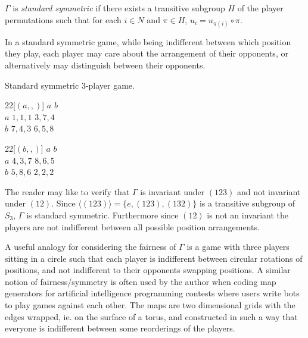 \begin{definition}
	$\Gamma$ is \textit{standard symmetric} \cite{NoahXE} if there exists a transitive subgroup $H$ of the player permutations such that for each $i \in N$ and $\pi \in H$, $u_i = u_{\pi(i)} \circ \pi$. 
\end{definition}

	In a standard symmetric game, while being indifferent between which position they play, each player may care about the arrangement of their opponents, or alternatively may distinguish between their opponents.

	\begin{example} \label{stdsymeg} Standard symmetric 3-player game.
		\begin{center}
  		\begin{game}{2}{2}[$(a,,)$]
				\>  $a$      \>  $b$      \\
			$a$	\>  $1,1,1$  \>  $3,7,4$  \\
			$b$	\>  $7,4,3$  \>  $6,5,8$  
		\end{game}
		\hspace*{5mm}
		\begin{game}{2}{2}[$(b,,)$]
				\>  $a$      \>  $b$      \\
			$a$	\>  $4,3,7$  \>  $8,6,5$  \\
   			$b$	\>  $5,8,6$  \>  $2,2,2$  
		\end{game}
		\end{center}
		
		The reader may like to verify that $\Gamma$ is invariant under $(123)$ and not invariant under $(12)$. Since $\langle (123)\rangle = \{e, (123), (132)\}$ is a transitive subgroup of $S_3$, $\Gamma$ is standard symmetric. Furthermore since $(12)$ is not an invariant the players are not indifferent between all possible position arrangements.
		
		A useful analogy for considering the fairness of $\Gamma$ is a game with three players sitting in a circle such that each player is indifferent between circular rotations of positions, and not indifferent to their opponents swapping positions. A similar notion of fairness/symmetry is often used by the author when coding map generators for artificial intelligence programming contests where users write bots to play games against each other. The maps are two dimensional grids with the edges wrapped, ie. on the surface of a torus, and constructed in such a way that everyone is indifferent between some reorderings of the players.
	\end{example}
	
